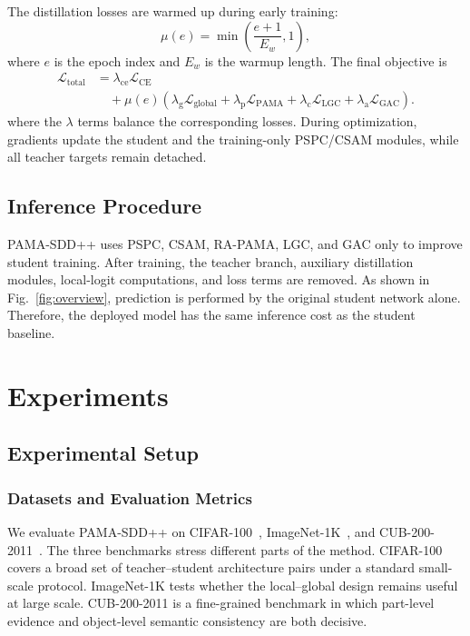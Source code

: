 \documentclass[a4paper,fleqn]{cas-dc}
\begin{document}
The distillation losses are warmed up during early training:
\begin{equation}
    \mu(e)=\min\left(\frac{e+1}{E_w},1\right),
\label{eq:warmup}
\end{equation}
where $e$ is the epoch index and $E_w$ is the warmup length. The final
objective is
\begin{equation}
\begin{aligned}
    \mathcal{L}_{\operatorname{total}}
    &=
    \lambda_{\operatorname{ce}}\mathcal{L}_{\operatorname{CE}}\\
    &\quad+\mu(e)\left(
    \lambda_{\operatorname{g}}\mathcal{L}_{\operatorname{global}}
    +\lambda_{\operatorname{p}}\mathcal{L}_{\operatorname{PAMA}}
    +\lambda_{\operatorname{c}}\mathcal{L}_{\operatorname{LGC}}
    +\lambda_{\operatorname{a}}\mathcal{L}_{\operatorname{GAC}}
    \right).
\end{aligned}
\label{eq:loss_total}
\end{equation}
where the $\lambda$ terms balance the corresponding losses. During
optimization, gradients update the student and the training-only PSPC/CSAM
modules, while all teacher targets remain detached.

\subsection{Inference Procedure}

PAMA-SDD++ uses PSPC, CSAM, RA-PAMA, LGC, and GAC only to improve student
training. After training, the teacher branch, auxiliary distillation modules,
local-logit computations, and loss terms are removed. As shown in
Fig.~\ref{fig:overview}, prediction is performed by the original student
network alone. Therefore, the deployed model has the same inference cost as
the student baseline.

\section{Experiments}
\label{sec:experiments}

\subsection{Experimental Setup}
\label{subsec:experimental_setup}

\subsubsection{Datasets and Evaluation Metrics}
We evaluate PAMA-SDD++ on CIFAR-100~\cite{krizhevsky2009learning},
ImageNet-1K~\cite{deng2009imagenet}, and
CUB-200-2011~\cite{wah2011cub}. The three benchmarks stress different parts
of the method. CIFAR-100 covers a broad set of teacher--student architecture
pairs under a standard small-scale protocol. ImageNet-1K tests whether the
local--global design remains useful at large scale. CUB-200-2011 is a
fine-grained benchmark in which part-level evidence and object-level semantic
consistency are both decisive.
\end{document}
